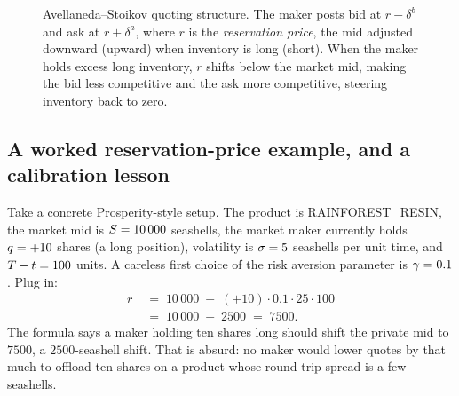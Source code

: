 \begin{figure}[ht]
\centering
{}
\caption{Avellaneda--Stoikov quoting structure. The maker posts bid at
$r - \delta^b$ and ask at $r + \delta^a$, where $r$ is the
\emph{reservation price}, the mid adjusted downward (upward) when
inventory is long (short). When the maker holds excess long inventory,
$r$ shifts below the market mid, making the bid less competitive and
the ask more competitive, steering inventory back to zero.}
\label{fig:as_number_line}
\end{figure}

\subsection{A worked reservation-price example, and a calibration lesson}
\label{subsec:ch8_r_worked}

Take a concrete Prosperity-style setup. The product is
RAINFOREST\_RESIN, the market mid is $S = 10\,000$ seashells, the
market maker currently holds $q = +10$ shares (a long position),
volatility is $\sigma = 5$ seashells per unit time, and
$T - t = 100$ units. A careless first choice of the risk
aversion parameter is $\gamma = 0.1$. Plug in:
\begin{align}
  r \;&=\; 10\,000 \;-\; (+10)\cdot 0.1 \cdot 25 \cdot 100
  \nonumber\\
  \;&=\; 10\,000 \;-\; 2500
  \;=\; 7500.
  \label{eq:ch8_r_bad}
\end{align}
The formula says a maker holding ten shares long should shift the
private mid to $7500$, a $2500$-seashell shift. That is absurd:
no maker would lower quotes by that much to offload ten shares on a
product whose round-trip spread is a few seashells.


